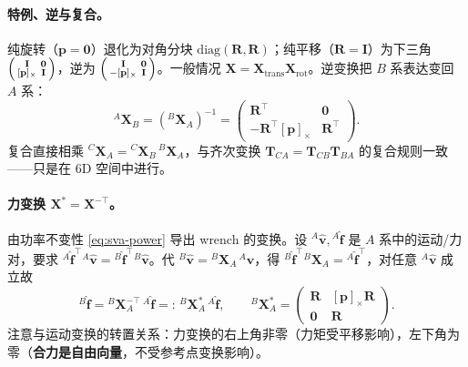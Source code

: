\paragraph{特例、逆与复合。}
纯旋转（$\mathbf p=\mathbf 0$）退化为对角分块 $\mathrm{diag}(\mathbf R,\mathbf R)$；纯平移（$\mathbf R=\mathbf I$）为下三角 $\begin{psmallmatrix}\mathbf I&\mathbf 0\\ [\mathbf p]_\times&\mathbf I\end{psmallmatrix}$，逆为 $\begin{psmallmatrix}\mathbf I&\mathbf 0\\ -[\mathbf p]_\times&\mathbf I\end{psmallmatrix}$。一般情况 $\mathbf X=\mathbf X_{\text{trans}}\mathbf X_{\text{rot}}$。逆变换把 $B$ 系表达变回 $A$ 系：
\begin{equation}
  {}^A\mathbf X_B=({}^B\mathbf X_A)^{-1}=\begin{pmatrix}\mathbf R^\top&\mathbf 0\\ -\mathbf R^\top[\mathbf p]_\times&\mathbf R^\top\end{pmatrix}.
  \label{eq:sva-Xinv}
\end{equation}
复合直接相乘 ${}^C\mathbf X_A={}^C\mathbf X_B\,{}^B\mathbf X_A$，与齐次变换 $\mathbf T_{CA}=\mathbf T_{CB}\mathbf T_{BA}$ 的复合规则一致——只是在 6D 空间中进行。

\paragraph{力变换 $\mathbf X^*=\mathbf X^{-\top}$。}
由功率不变性 \cref{eq:sva-power} 导出 wrench 的变换。设 ${}^A\hat{\mathbf v},{}^A\hat{\mathbf f}$ 是 $A$ 系中的运动/力对，要求 ${}^A\hat{\mathbf f}^\top{}^A\hat{\mathbf v}={}^B\hat{\mathbf f}^\top{}^B\hat{\mathbf v}$。代 ${}^B\hat{\mathbf v}={}^B\mathbf X_A\,{}^A\hat{\mathbf v}$，得 ${}^B\hat{\mathbf f}^\top{}^B\mathbf X_A={}^A\hat{\mathbf f}^\top$，对任意 ${}^A\hat{\mathbf v}$ 成立故
\begin{equation}
  {}^B\hat{\mathbf f}={}^B\mathbf X_A^{-\top}\,{}^A\hat{\mathbf f}=:\,{}^B\mathbf X_A^*\,{}^A\hat{\mathbf f},
  \qquad
  {}^B\mathbf X_A^*=\begin{pmatrix}\mathbf R&[\mathbf p]_\times\mathbf R\\ \mathbf 0&\mathbf R\end{pmatrix}.
  \label{eq:sva-Xstar}
\end{equation}
注意与运动变换的转置关系：力变换的右上角非零（力矩受平移影响），左下角为零（\textbf{合力是自由向量}，不受参考点变换影响）。

